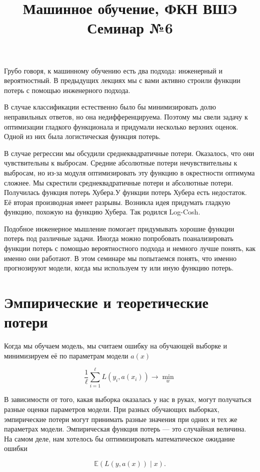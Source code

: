 \documentclass[12pt,a4paper]{article}
\title{Машинное обучение, ФКН ВШЭ\\Семинар №6}
\author{}
\date{}
\begin{document}
	\maketitle
	
Грубо говоря, к машинному обучению есть два подхода: инженерный и вероятностный. В предыдущих лекциях мы с вами активно строили функции потерь с помощью инженерного подхода. 

В случае классификации естественно было бы минимизировать долю неправильных ответов, но она недифференцируема. Поэтому мы свели задачу к оптимизации гладкого функционала и придумали несколько верхних оценок. Одной из них была логистическая функция потерь.
	
В случае регрессии мы обсудили среднеквадратичные потери. Оказалось, что они чувствительны к выбросам. Средние абсолютные потери нечувствительны к выбросам, но из-за модуля оптимизировать эту функцию в окрестности оптимума сложнее. Мы скрестили среднеквадратичные потери и абсолютные потери. Получилась функция потерь Хубера.У функции потерь Хубера есть недостаток. Её вторая производная имеет разрывы. Возникла идея придумать гладкую функцию, похожую на функцию Хубера. Так родился Log-Cosh. 

Подобное инженерное мышление помогает придумывать хорошие функции потерь под различные задачи. Иногда можно попробовать поанализировать функции потерь с помощью вероятностного подхода и немного лучше понять, как именно они работают. В этом семинаре мы попытаемся понять, что именно прогнозируют модели, когда мы используем ту или иную функцию потерь. 

\section{Эмпирические и теоретические потери}

Когда мы обучаем модель, мы считаем ошибку на обучающей выборке и минимизируем её по параметрам модели $a(x)$

\[
\frac{1}{\ell} \sum_{i=1}^{\ell} L(y_i, a(x_i)) \to \min_{w}
\]

В зависимости от того, какая выборка оказалась у нас в руках, могут получаться разные оценки параметров модели. При разных обучающих выборках, эмпирические потери могут принимать разные значения при одних и тех же параметрах модели. Эмпирическая функция потерь --- это случайная величина. На самом деле, нам хотелось бы оптимизировать математическое ожидание ошибки

\[
\mathbb{E}(L(y, a(x)) \mid x).
\]
\end{document}
